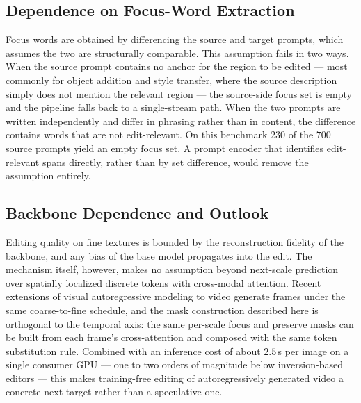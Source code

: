 \subsection{Dependence on Focus-Word Extraction}

Focus words are obtained by differencing the source and target prompts, which
assumes the two are structurally comparable. This assumption fails in two ways.
When the source prompt contains no anchor for the region to be edited --- most
commonly for object addition and style transfer, where the source description
simply does not mention the relevant region --- the source-side focus set is
empty and the pipeline falls back to a single-stream path. When the two prompts
are written independently and differ in phrasing rather than in content, the
difference contains words that are not edit-relevant. On this benchmark $230$
of the $700$ source prompts yield an empty focus set. A prompt encoder that
identifies edit-relevant spans directly, rather than by set difference, would
remove the assumption entirely.

\subsection{Backbone Dependence and Outlook}

Editing quality on fine textures is bounded by the reconstruction fidelity of the
backbone, and any bias of the base model propagates into the edit. The
mechanism itself, however, makes no assumption beyond next-scale prediction over
spatially localized discrete tokens with cross-modal attention. Recent extensions
of visual autoregressive modeling to video generate frames under the same
coarse-to-fine schedule, and the mask construction described here is orthogonal
to the temporal axis: the same per-scale focus and preserve masks can be built
from each frame's cross-attention and composed with the same token substitution
rule. Combined with an inference cost of about $2.5$\,s per image on a single
consumer GPU --- one to two orders of magnitude below inversion-based editors ---
this makes training-free editing of autoregressively generated video a concrete
next target rather than a speculative one.

